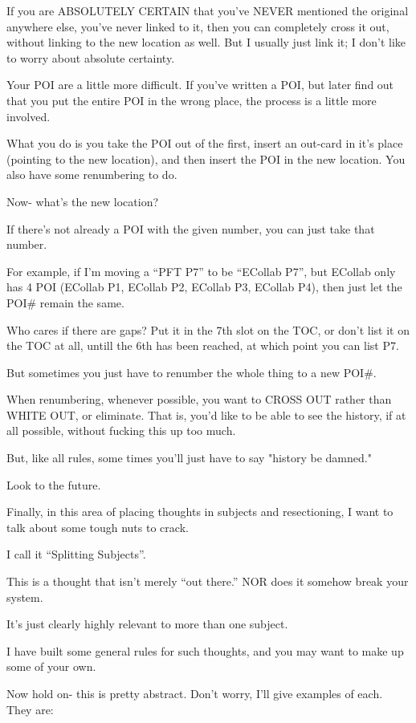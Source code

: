\documentclass[oneside]{book}
\begin{document}
If you are ABSOLUTELY CERTAIN that you've NEVER mentioned the original
anywhere else, you've never linked to it, then you can completely
cross it out, without linking to the new location as well. But I
usually just link it; I don't like to worry about absolute certainty.

Your POI are a little more difficult. If you've written a POI, but
later find out that you put the entire POI in the wrong place, the
process is a little more involved.

What you do is you take the POI out of the first, insert an out-card
in it's place (pointing to the new location), and then insert the POI
in the new location. You also have some renumbering to do.

Now- what's the new location?

If there's not already a POI with the given number, you can just take
that number.

For example, if I'm moving a ``PFT P7'' to be ``ECollab P7'', but ECollab
only has 4 POI (ECollab P1, ECollab P2, ECollab P3, ECollab P4), then
just let the POI\# remain the same.

Who cares if there are gaps? Put it in the 7th slot on the TOC, or
don't list it on the TOC at all, untill the 6th has been reached, at
which point you can list P7.

But sometimes you just have to renumber the whole thing to a new POI\#.

When renumbering, whenever possible, you want to CROSS OUT rather than
WHITE OUT, or eliminate. That is, you'd like to be able to see the
history, if at all possible, without fucking this up too much.

But, like all rules, some times you'll just have to say "history be
damned."

Look to the future.

Finally, in this area of placing thoughts in subjects and
resectioning, I want to talk about some tough nuts to crack.

I call it ``Splitting Subjects''.

This is a thought that isn't merely ``out there.'' NOR does it somehow
break your system.

It's just clearly highly relevant to more than one subject.

I have built some general rules for such thoughts, and you may want to
make up some of your own.

Now hold on- this is pretty abstract. Don't worry, I'll give examples
of each. They are:
\end{document}
